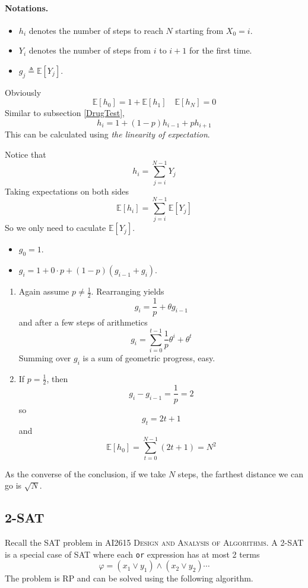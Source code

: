 \paragraph*{Notations.}
\begin{itemize}
    \item $h_i$ denotes the number of steps to reach $N$ starting from $X_0=i$.
    \item $Y_i$ denotes the number of steps from $i$ to $i+1$ for the first time.
    \item $g_j \triangleq \mathbb{E}[Y_j]$.
\end{itemize}
Obviously
\[ \mathbb{E}[h_0] = 1 + \mathbb{E}[h_1] \quad \mathbb{E}[h_N] = 0 \]
Similar to subsection \ref{DrugTest},
\[ h_i = 1+ (1-p)h_{i-1} + ph_{i+1} \]
This can be calculated using \emph{the linearity of expectation}. 

Notice that
\[ h_i = \sum_{j=i}^{N-1}Y_j \]
Taking expectations on both sides
\[ \mathbb{E}[h_i] = \sum_{j=i}^{N-1}\mathbb{E}[Y_j] \]
So we only need to caculate $\mathbb{E}[Y_j]$.
\begin{itemize}
    \item $g_0 = 1$.
    \item $g_i = 1 + 0 \cdot p + (1-p)(g_{i-1}+g_i)$.
\end{itemize}
\begin{enumerate}
    \item Again assume $p \neq \frac{1}{2}$. 
    Rearranging yields
    \[ g_i = \frac{1}{p} + \theta g_{i-1} \]
    and after a few steps of arithmetics
    \[ g_i = \sum_{i=0}^{t-1}\frac{1}{p}\theta^i + \theta^t \]
    Summing over $g_i$ is a sum of geometric progress, easy.
    \item If $p = \frac{1}{2}$, then
    \[ g_{i} - g_{i-1} = \frac{1}{p} = 2 \]
    so
    \[ g_t = 2t + 1 \]
    and
    \[ \mathbb{E}[h_0] = \sum_{t=0}^{N-1}(2t+1) = N^2 \]
\end{enumerate}
\begin{remark}
    As the converse of the conclusion, if we take $N$ steps, the farthest distance we can go is $\sqrt{N}$.
\end{remark}

\subsection{2-SAT}
Recall the SAT problem in \textsc{AI2615 Design and Analysis of Algorithms}. A 2-SAT is a special case of SAT where each \verb|or| expression has at most 2 terms
\[ \varphi = (x_1 \vee y_1) \wedge (x_2 \vee y_2) \cdots \]
The problem is RP and can be solved using the following algorithm.

